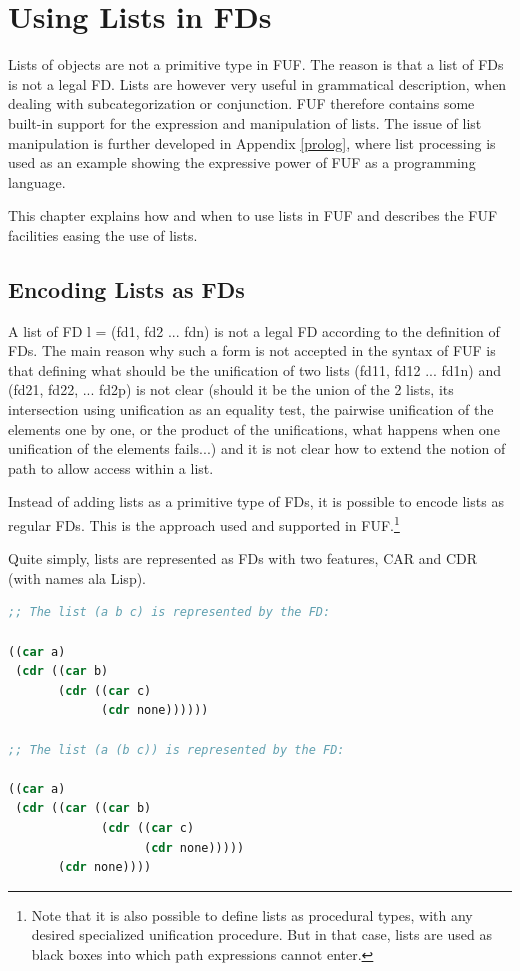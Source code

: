 \documentclass[10pt,a4paper]{report}
\begin{document}
\chapter{Using Lists in FDs}
\label{fdlist}

Lists of objects are not a primitive type in FUF.  The reason is that a
list of FDs is not a legal FD.  Lists are however very useful in
grammatical description, when dealing with subcategorization or
conjunction.  FUF therefore contains some built-in support for the
expression and manipulation of lists.  The issue of list manipulation is
further developed in Appendix \ref{prolog}, where list processing is used
as an example showing the expressive power of FUF as a programming
language.  

This chapter explains how and when to use lists in FUF and describes the
FUF facilities easing the use of lists.

\section{Encoding Lists as FDs}

A list of FD l = (fd1, fd2 ... fdn) is not a legal FD according to the
definition of FDs.  The main reason why such a form is not accepted in the
syntax of FUF is that defining what should be the unification of two lists
(fd11, fd12 ... fd1n) and (fd21, fd22, ... fd2p) is not clear (should it be
the union of the 2 lists, its intersection using unification as an equality
test, the pairwise unification of the elements one by one, or the product
of the unifications, what happens when one unification of the elements
fails...) and it is not clear how to extend the notion of path to allow
access within a list.

Instead of adding lists as a primitive type of FDs, it is possible to
encode lists as regular FDs.  This is the approach used and supported in
FUF.\footnote{Note that it is also possible to define lists as procedural
types, with any desired specialized unification procedure.  But in that
case, lists are used as black boxes into which path expressions cannot
enter.} 

Quite simply, lists are represented as FDs with two features,
CAR and CDR (with names ala Lisp). 

\begin{lstlisting}[language=Lisp]
;; The list (a b c) is represented by the FD:

((car a)
 (cdr ((car b)
       (cdr ((car c)
             (cdr none))))))

;; The list (a (b c)) is represented by the FD:

((car a)
 (cdr ((car ((car b)
             (cdr ((car c)
                   (cdr none)))))
       (cdr none))))
\end{lstlisting}
\end{document}
